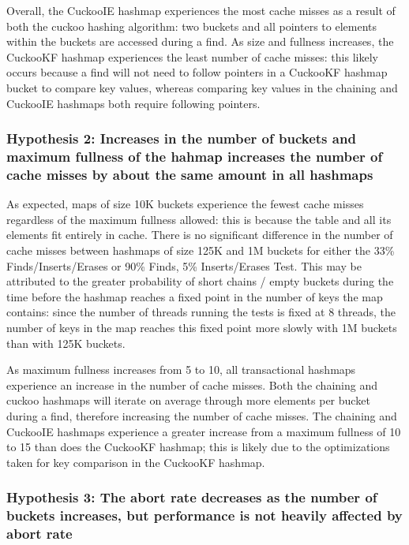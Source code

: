 Overall, the CuckooIE hashmap experiences the most cache misses as a result of both the cuckoo hashing algorithm: two buckets and all pointers to elements within the buckets are accessed during a find. As size and fullness increases, the CuckooKF hashmap experiences the least number of cache misses: this likely occurs because a find will not need to follow pointers in a CuckooKF hashmap bucket to compare key values, whereas comparing key values in the chaining and CuckooIE hashmaps both require following pointers.

\subsubsection{Hypothesis 2: Increases in the number of buckets and maximum fullness of the hahmap increases the number of cache misses by about the same amount in all hashmaps}

As expected, maps of size 10K buckets experience the fewest cache misses regardless of the maximum fullness allowed: this is because the table and all its elements fit entirely in cache. There is no significant difference in the number of cache misses between hashmaps of size 125K and 1M buckets for either the 33\% Finds/Inserts/Erases  or 90\% Finds, 5\% Inserts/Erases Test. This may be attributed to the greater probability of short chains / empty buckets during the time before the hashmap reaches a fixed point in the number of keys the map contains: since the number of threads running the tests is fixed at 8 threads, the number of keys in the map reaches this fixed point more slowly with 1M buckets than with 125K buckets.

As maximum fullness increases from 5 to 10, all transactional hashmaps experience an increase in the number of cache misses. Both the chaining and cuckoo hashmaps will iterate on average through more elements per bucket during a find, therefore increasing the number of cache misses. The chaining and CuckooIE hashmaps experience a greater increase from a maximum fullness of 10 to 15 than does the CuckooKF hashmap; this is likely due to the optimizations taken for key comparison in the CuckooKF hashmap.

\subsubsection{Hypothesis 3: The abort rate decreases as the number of buckets increases, but performance is not heavily affected by abort rate}

